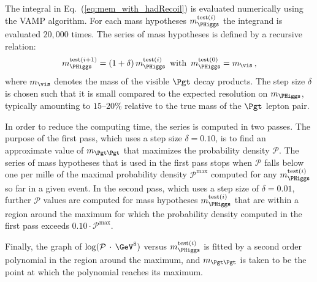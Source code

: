 The integral in Eq.~(\ref{eq:mem_with_hadRecoil}) is evaluated numerically using the VAMP algorithm.
For each mass hypotheses $m_{\PHiggs}^{\textrm{test}(i)}$ the integrand is evaluated $20,000$ times.
The series of mass hypotheses is defined by a recursive relation: 
\begin{equation}
m_{\PHiggs}^{\textrm{test}(i + 1)} = (1 + \delta) \,  m_{\PHiggs}^{\textrm{test}(i)} \, \mbox{ with } \, m_{\PHiggs}^{\textrm{test}(0)} = m_{\vis} \, ,
\label{eq:mTauTau_step_size}
\end{equation}
where $m_{\vis}$ denotes the mass of the visible $\Pgt$ decay products.
The step size $\delta$ is chosen such that it is small compared to the
expected resolution on $m_{\PHiggs}$,
typically amounting to $15$--$20\%$ relative to the true mass of the $\Pgt$ lepton pair.

In order to reduce the computing time, the series is computed in two passes.
The purpose of the first pass, which uses a step size $\delta = 0.10$, is to find an approximate value of $m_{\Pgt\Pgt}$
that maximizes the probability density $\mathcal{P}$.
The series of mass hypotheses that is used in the first pass stops when $\mathcal{P}$ falls below one per mille 
of the maximal probability density $\mathcal{P}^{\textrm{max}}$
computed for any $m_{\PHiggs}^{\textrm{test}(i)}$ so far in a given event.
In the second pass, which uses a step size of $\delta = 0.01$,
further $\mathcal{P}$ values 
are computed for mass hypotheses $m_{\PHiggs}^{\textrm{test}(i)}$ that
are within a region around the maximum
for which the probability density computed in the first pass exceeds
$0.10 \cdot \mathcal{P}^{\textrm{max}}$.

Finally, the graph of $\log(\mathcal{P} \, \cdot \, \mbox{\GeV}^{8})$ 
versus $m_{\PHiggs}^{\textrm{test}(i)}$ is fitted by a second order polynomial
in the region around the maximum,
and $m_{\Pgt\Pgt}$ is taken to be the point at which the polynomial reaches its maximum.
